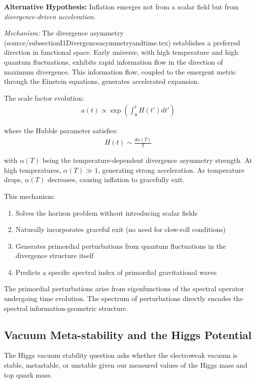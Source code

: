 \documentclass[12pt,a4paper]{article}
\begin{document}
\textbf{Alternative Hypothesis:} Inflation emerges not from a scalar field but from \textit{divergence-driven acceleration}.

\textit{Mechanism:} The divergence asymmetry (source/subsectionI1Divergenceasymmetryandtime.tex) establishes a preferred direction in functional space. Early universe, with high temperature and high quantum fluctuations, exhibits rapid information flow in the direction of maximum divergence. This information flow, coupled to the emergent metric through the Einstein equations, generates accelerated expansion.

The scale factor evolution:
\begin{align}
a(t) \propto \exp(\int_0^t H(t') dt')
\end{align}

where the Hubble parameter satisfies:
\begin{align}
H(t) \sim \frac{d\alpha(T)}{T}
\end{align}

with $\alpha(T)$ being the temperature-dependent divergence asymmetry strength. At high temperatures, $\alpha(T) \gg 1$, generating strong acceleration. As temperature drops, $\alpha(T)$ decreases, causing inflation to gracefully exit.

This mechanism:
\begin{enumerate}
\item Solves the horizon problem without introducing scalar fields
\item Naturally incorporates graceful exit (no need for slow-roll conditions)
\item Generates primordial perturbations from quantum fluctuations in the divergence structure itself
\item Predicts a specific spectral index of primordial gravitational waves
\end{enumerate}

The primordial perturbations arise from eigenfunctions of the spectral operator undergoing time evolution. The spectrum of perturbations directly encodes the spectral information-geometric structure.

\subsection{Vacuum Meta-stability and the Higgs Potential}

The Higgs vacuum stability question asks whether the electroweak vacuum is stable, metastable, or unstable given our measured values of the Higgs mass and top quark mass.
\end{document}
